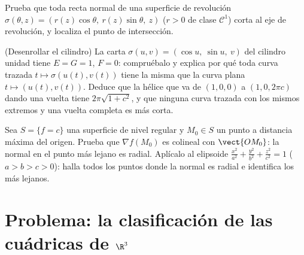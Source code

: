 \begin{exercise}[$\star\star$]\label{exo:b2:surfaces:10}
Prueba que toda recta normal de una superficie de revolución
$\sigma(\theta, z) = (r(z)\cos\theta,\ r(z)\sin\theta,\ z)$ ($r > 0$
de clase $\mathcal C^1$) corta al eje de revolución, y localiza el
punto de intersección.
\end{exercise}

\begin{exercise}[$\star\star$]\label{exo:b2:surfaces:11}
(Desenrollar el cilindro) La carta $\sigma(u, v) = (\cos u,\ \sin
u,\ v)$ del cilindro unidad tiene $E = G = 1$, $F = 0$: compruébalo y
explica por qué toda curva trazada $t \mapsto \sigma(u(t), v(t))$
tiene la misma  que la curva plana $t \mapsto (u(t),
v(t))$. Deduce que la hélice que va de $(1, 0, 0)$ a $(1, 0, 2\pi c)$
dando una vuelta tiene  $2\pi\sqrt{1 + c^2}$, y que ninguna
curva trazada con los mismos extremos y una vuelta completa es más
corta.
\end{exercise}

\begin{exercise}[$\star\star\star$]\label{exo:b2:surfaces:12}
Sea $S = \{f = c\}$ una superficie de nivel regular  y $M_0
\in S$ un punto a distancia máxima del origen. Prueba que $\nabla
f(M_0)$ es colineal con $\vect{OM_0}$: la normal en el punto más
lejano es radial. Aplícalo al elipsoide $\frac{x^2}{a^2} +
\frac{y^2}{b^2} + \frac{z^2}{c^2} = 1$ ($a > b > c > 0$): halla todos
los puntos donde la normal es radial e identifica los más lejanos.
\end{exercise}

\section{Problema: la clasificación de las cuádricas de $\R^3$}

